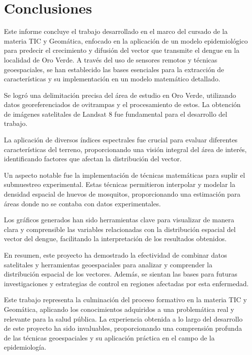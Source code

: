 \section{Conclusiones}

Este informe concluye el trabajo desarrollado en el marco del cursado de la materia TIC y Geomática, enfocado en la aplicación de un modelo epidemiológico para predecir el crecimiento y difusión del vector que transmite el dengue en la localidad de Oro Verde. A través del uso de sensores remotos y técnicas geoespaciales, se han establecido las bases esenciales para la extracción de características y su implementación en un modelo matemático detallado.

Se logró una delimitación precisa del área de estudio en Oro Verde, utilizando datos georeferenciados de ovitrampas y el procesamiento de estos. La obtención de imágenes satelitales de Landsat 8 fue fundamental para el desarrollo del trabajo.

La aplicación de diversos índices espectrales fue crucial para evaluar diferentes características del terreno, proporcionando una visión integral del área de interés, identificando factores que afectan la distribución del vector.

Un aspecto notable fue la implementación de técnicas matemáticas para suplir el submuestreo experimental. Estas técnicas permitieron interpolar y modelar la densidad espacial de huevos de mosquitos, proporcionando una estimación para áreas donde no se contaba con datos experimentales.

Los gráficos generados han sido herramientas clave para visualizar de manera clara y comprensible las variables relacionadas con la distribución espacial del vector del dengue, facilitando la interpretación de los resultados obtenidos.

En resumen, este proyecto ha demostrado la efectividad de combinar datos satelitales y herramientas geoespaciales para analizar y comprender la distribución espacial de los vectores. Además, se sientan las bases para futuras investigaciones y estrategias de control en regiones afectadas por esta enfermedad.

Este trabajo representa la culminación del proceso formativo en la materia TIC y Geomática, aplicando los conocimientos adquiridos a una problemática real y relevante para la salud pública. La experiencia obtenida a lo largo del desarrollo de este proyecto ha sido invaluables, proporcionando una comprensión profunda de las técnicas geoespaciales y su aplicación práctica en el campo de la epidemiología.

